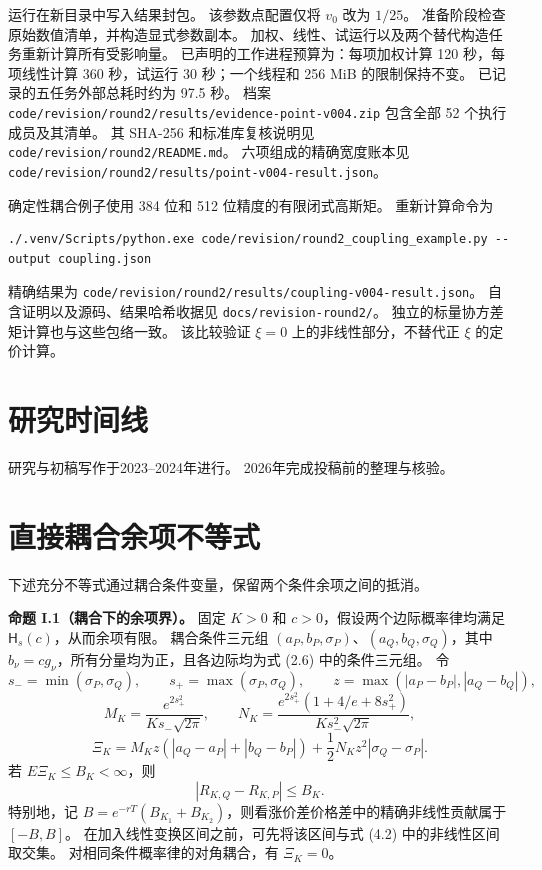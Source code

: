 运行在新目录中写入结果封包。
该参数点配置仅将 \(v_0\) 改为 \(1/25\)。
准备阶段检查原始数值清单，并构造显式参数副本。
加权、线性、试运行以及两个替代构造任务重新计算所有受影响量。
已声明的工作进程预算为：每项加权计算 120 秒，每项线性计算 360 秒，试运行 30 秒；一个线程和 256 MiB 的限制保持不变。
已记录的五任务外部总耗时约为 97.5 秒。
档案 \texttt{code/revision/round2/results/evidence-point-v004.zip} 包含全部 52 个执行成员及其清单。
其 SHA-256 和标准库复核说明见 \texttt{code/revision/round2/README.md}。
六项组成的精确宽度账本见 \texttt{code/revision/round2/results/point-v004-result.json}。

确定性耦合例子使用 384 位和 512 位精度的有限闭式高斯矩。
重新计算命令为

\begin{verbatim}
./.venv/Scripts/python.exe code/revision/round2_coupling_example.py --output coupling.json
\end{verbatim}

精确结果为 \texttt{code/revision/round2/results/coupling-v004-result.json}。
自含证明以及源码、结果哈希收据见 \texttt{docs/revision-round2/}。
独立的标量协方差矩计算也与这些包络一致。
该比较验证 \(\xi=0\) 上的非线性部分，不替代正 \(\xi\) 的定价计算。

\section{研究时间线}

研究与初稿写作于2023--2024年进行。
2026年完成投稿前的整理与核验。

\section{直接耦合余项不等式}

下述充分不等式通过耦合条件变量，保留两个条件余项之间的抵消。

\textbf{命题 I.1（耦合下的余项界）。}
固定 \(K>0\) 和 \(c>0\)，假设两个边际概率律均满足 \(\mathsf H_s(c)\)，从而余项有限。
耦合条件三元组 \((a_P,b_P,\sigma_P)\)、\((a_Q,b_Q,\sigma_Q)\)，其中 \(b_\nu=cg_\nu\)，所有分量均为正，且各边际均为式 (2.6) 中的条件三元组。
令
\[
s_- =\min(\sigma_P,\sigma_Q),\qquad
s_+ =\max(\sigma_P,\sigma_Q),\qquad
z=\max(|a_P-b_P|,|a_Q-b_Q|),
\]
\[
M_K=\frac{e^{2s_+^2}}{K s_-\sqrt{2\pi}},\qquad
N_K=\frac{e^{2s_+^2}(1+4/e+8s_+^2)}{K s_-^2\sqrt{2\pi}},
\]
\[
\Xi_K=M_Kz\left(|a_Q-a_P|+|b_Q-b_P|\right)
       +\frac12N_Kz^2|\sigma_Q-\sigma_P|.
\]
若 \(E\Xi_K\le B_K<\infty\)，则
\[
|R_{K,Q}-R_{K,P}|\le B_K.                       \tag{I.1}
\]
特别地，记 \(B=e^{-rT}(B_{K_1}+B_{K_2})\)，则看涨价差价格差中的精确非线性贡献属于
\([-B,B]\)。
在加入线性变换区间之前，可先将该区间与式 (4.2) 中的非线性区间取交集。
对相同条件概率律的对角耦合，有 \(\Xi_K=0\)。

